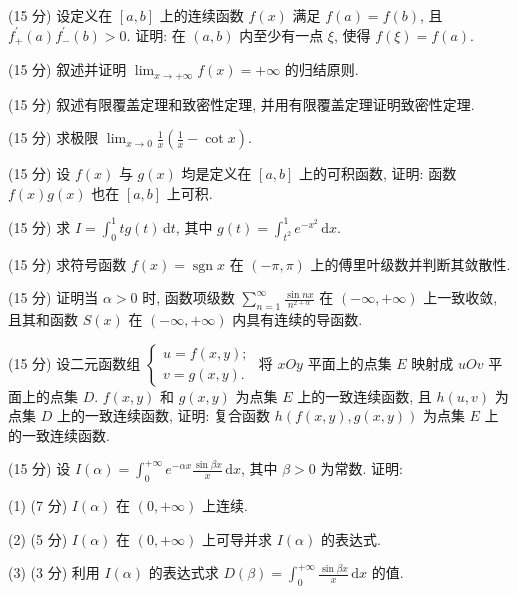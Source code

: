 (15 分) 设定义在 $[a, b]$ 上的连续函数 $f(x)$ 满足 $f(a) = f(b)$, 且 $f_{+}^{\prime}(a)f_{-}^{\prime}(b) > 0$. 证明: 在 $(a, b)$ 内至少有一点 $\xi$, 使得 $f(\xi) = f(a)$.\par
(15 分) 叙述并证明 $\lim_{x \to +\infty} f(x) = +\infty$ 的归结原则.\par
(15 分) 叙述有限覆盖定理和致密性定理, 并用有限覆盖定理证明致密性定理.\par
(15 分) 求极限 $\lim_{x \to 0} \frac{1}{x} \left( \frac{1}{x} - \cot x \right)$.\par
(15 分) 设 $f(x)$ 与 $g(x)$ 均是定义在 $[a, b]$ 上的可积函数, 证明: 函数 $f(x)g(x)$ 也在 $[a, b]$ 上可积.\par
(15 分) 求 $I = \int_{0}^{1} tg(t) \, \mathrm{d}t$, 其中 $g(t) = \int_{t^2}^{1} e^{-x^2} \, \mathrm{d}x$.\par
(15 分) 求符号函数 $f(x) = \operatorname{sgn} x$ 在 $(- \pi, \pi)$ 上的傅里叶级数并判断其敛散性.\par
(15 分) 证明当 $\alpha > 0$ 时, 函数项级数 $\sum_{n=1}^{\infty} \frac{\sin nx}{n^{2+\alpha}}$ 在 $(- \infty, +\infty)$ 上一致收敛, 且其和函数 $S(x)$ 在 $(- \infty, +\infty)$ 内具有连续的导函数.\par
(15 分) 设二元函数组 $\left\{ \begin{array}{l} u = f(x, y); \\ v = g(x, y). \end{array} \right.$ 将 $xOy$ 平面上的点集 $E$ 映射成 $uOv$ 平面上的点集 $D$. $f(x, y)$ 和 $g(x, y)$ 为点集 $E$ 上的一致连续函数, 且 $h(u, v)$ 为点集 $D$ 上的一致连续函数, 证明: 复合函数 $h(f(x, y), g(x, y))$ 为点集 $E$ 上的一致连续函数.\par
(15 分) 设 $I(\alpha) = \int_{0}^{+\infty} e^{-\alpha x} \frac{\sin \beta x}{x} \, \mathrm{d}x$, 其中 $\beta > 0$ 为常数. 证明:\par
(1) (7 分) $I(\alpha)$ 在 $(0, +\infty)$ 上连续.\par
(2) (5 分) $I(\alpha)$ 在 $(0, +\infty)$ 上可导并求 $I(\alpha)$ 的表达式.\par
(3) (3 分) 利用 $I(\alpha)$ 的表达式求 $D(\beta) = \int_{0}^{+\infty} \frac{\sin \beta x}{x} \, \mathrm{d}x$ 的值.\par
